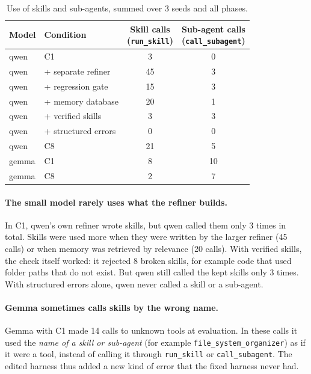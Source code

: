 \begin{table}[t]
\centering
\small
\begin{tabular}{llcc}
\toprule
Model & Condition & \makecell{Skill calls\\(\texttt{run\_skill})} & \makecell{Sub-agent calls\\(\texttt{call\_subagent})} \\
\midrule
qwen  & C1                  & 3  & 0 \\
qwen  & + separate refiner  & 45 & 3 \\
qwen  & + regression gate   & 15 & 3 \\
qwen  & + memory database   & 20 & 1 \\
qwen  & + verified skills   & 3  & 3 \\
qwen  & + structured errors & 0  & 0 \\
qwen  & C8                  & 21 & 5 \\
\midrule
gemma & C1                  & 8  & 10 \\
gemma & C8                  & 2  & 7 \\
\bottomrule
\end{tabular}
\caption{Use of skills and sub-agents, summed over 3 seeds and all phases.}
\label{tab:tooluse}
\end{table}

\paragraph{The small model rarely uses what the refiner builds.}
In C1, qwen's own refiner wrote skills, but qwen called them only 3 times in total. Skills were used
more when they were written by the larger refiner (45 calls) or when memory was retrieved by
relevance (20 calls). With verified skills, the check itself worked: it rejected 8 broken skills,
for example code that used folder paths that do not exist. But qwen still called the kept skills only
3 times. With structured errors alone, qwen never called a skill or a sub-agent.

\paragraph{Gemma sometimes calls skills by the wrong name.}
Gemma with C1 made 14 calls to unknown tools at evaluation. In these calls it used the \emph{name of
a skill or sub-agent} (for example \texttt{file\_system\_organizer}) as if it were a tool, instead of
calling it through \texttt{run\_skill} or \texttt{call\_subagent}. The edited harness thus added a
new kind of error that the fixed harness never had.
